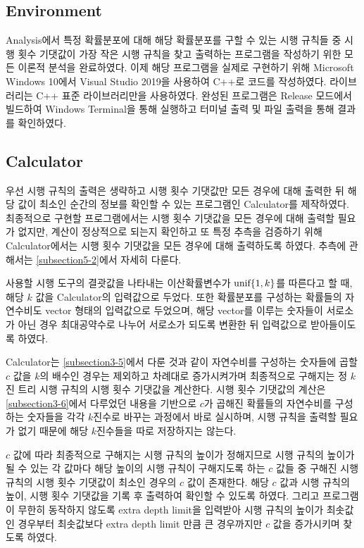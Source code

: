 \documentclass[11pt]{article}
\begin{document}
\subsection{Environment}
Analysis에서 특정 확률분포에 대해 해당 확률분포를 구할 수 있는 시행 규칙들 중 시행 횟수 기댓값이 가장 작은 시행 규칙을 찾고 출력하는 프로그램을 작성하기 위한 모든 이론적 분석을 완료하였다. 이제 해당 프로그램을 실제로 구현하기 위해 Microsoft Windows 10에서 Visual Studio 2019을 사용하여 C++로 코드를 작성하였다. 라이브러리는 C++ 표준 라이브러리만을 사용하였다. 완성된 프로그램은 Release 모드에서 빌드하여 Windows Terminal을 통해 실행하고 터미널 출력 및 파일 출력을 통해 결과를 확인하였다.

\subsection{Calculator} \label{subsection4-2}
우선 시행 규칙의 출력은 생략하고 시행 횟수 기댓값만 모든 경우에 대해 출력한 뒤 해당 값이 최소인 순간의 정보를 확인할 수 있는 프로그램인 Calculator를 제작하였다. 최종적으로 구현할 프로그램에서는 시행 횟수 기댓값을 모든 경우에 대해 출력할 필요가 없지만, 계산이 정상적으로 되는지 확인하고 또 특정 추측을 검증하기 위해 Calculator에서는 시행 횟수 기댓값을 모든 경우에 대해 출력하도록 하였다. 추측에 관해서는 \ref{subsection5-2}에서 자세히 다룬다.

사용할 시행 도구의 결괏값을 나타내는 이산확률변수가 $\textnormal{unif}\{1, k\}$를 따른다고 할 때, 해당 $k$ 값을 Calculator의 입력값으로 두었다. 또한 확률분포를 구성하는 확률들의 자연수비도 vector 형태의 입력값으로 두었으며, 해당 vector를 이루는 숫자들이 서로소가 아닌 경우 최대공약수로 나누어 서로소가 되도록 변환한 뒤 입력값으로 받아들이도록 하였다.

Calculator는 \ref{subsection3-5}에서 다룬 것과 같이 자연수비를 구성하는 숫자들에 곱할 $c$ 값을 $k$의 배수인 경우는 제외하고 차례대로 증가시켜가며 최종적으로 구해지는 정 $k$진 트리 시행 규칙의 시행 횟수 기댓값을 계산한다. 시행 횟수 기댓값의 계산은 \ref{subsection3-6}에서 다루었던 내용을 기반으로 $c$가 곱해진 확률들의 자연수비를 구성하는 숫자들을 각각 $k$진수로 바꾸는 과정에서 바로 실시하며, 시행 규칙을 출력할 필요가 없기 때문에 해당 $k$진수들을 따로 저장하지는 않는다.

$c$ 값에 따라 최종적으로 구해지는 시행 규칙의 높이가 정해지므로 시행 규칙의 높이가 될 수 있는 각 값마다 해당 높이의 시행 규칙이 구해지도록 하는 $c$ 값들 중 구해진 시행 규칙의 시행 횟수 기댓값이 최소인 경우의 $c$ 값이 존재한다. 해당 $c$ 값과 시행 규칙의 높이, 시행 횟수 기댓값을 기록 후 출력하여 확인할 수 있도록 하였다. 그리고 프로그램이 무한히 동작하지 않도록 extra depth limit을 입력받아 시행 규칙의 높이가 최솟값인 경우부터 최솟값보다 extra depth limit 만큼 큰 경우까지만 $c$ 값을 증가시키며 찾도록 하였다. 
\end{document}

